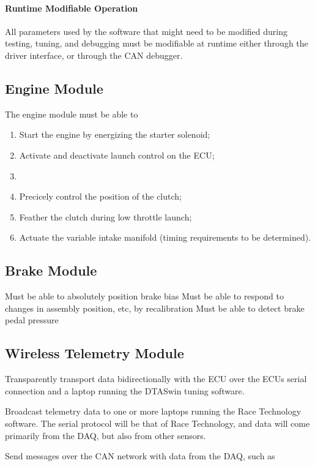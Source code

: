 \paragraph{Runtime Modifiable Operation}
All parameters used by the software that might need to be modified during testing, tuning, and debugging must be modifiable at runtime either through the driver interface, or through the CAN debugger.

\subsection{Engine Module}
The engine module must be able to
\begin{enumerate}
 \item Start the engine by energizing the starter solenoid;
 \item Activate and deactivate launch control on the ECU;
 \item 
 \item Precicely control the position of the clutch;
 \item Feather the clutch during low throttle launch;
 \item Actuate the variable intake manifold (timing requirements to be determined).
\end{enumerate}

\subsection{Brake Module}
Must be able to absolutely position brake bias
Must be able to respond to changes in assembly position, etc, by recalibration
Must be able to detect brake pedal pressure

\subsection{Wireless Telemetry Module}

Transparently transport data bidirectionally with the ECU over the ECUs serial
connection and a laptop running the DTASwin tuning software.

Broadcast telemetry data to one or more laptops running the Race Technology
software. The serial protocol will be that of Race Technology, and data will
come primarily from the DAQ, but also from other sensors.

Send messages over the CAN network with data from the DAQ, such as


